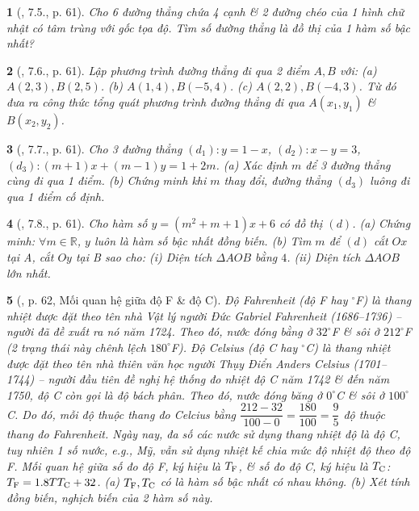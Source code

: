 \documentclass{article}
\newtheorem{baitoan}{}
\begin{document}
\begin{baitoan}[\cite{Binh_boi_duong_Toan_9_tap_1}, 7.5., p. 61]
	Cho 6 đường thẳng chứa 4 cạnh \& 2 đường chéo của 1 hình chữ nhật có tâm trùng với gốc tọa độ. Tìm số đường thẳng là đồ thị của 1 hàm số bậc nhất?
\end{baitoan}

\begin{baitoan}[\cite{Binh_boi_duong_Toan_9_tap_1}, 7.6., p. 61]
	Lập phương trình đường thẳng đi qua 2 điểm $A,B$ với: (a) $A(2,3),B(2,5)$. (b) $A(1,4),B(-5,4)$. (c) $A(2,2),B(-4,3)$. Từ đó đưa ra công thức tổng quát phương trình đường thẳng đi qua $A(x_1,y_1)$ \& $B(x_2,y_2)$.
\end{baitoan}

\begin{baitoan}[\cite{Binh_boi_duong_Toan_9_tap_1}, 7.7., p. 61]
	Cho 3 đường thẳng $(d_1):y = 1 - x$, $(d_2):x - y = 3$, $(d_3):(m + 1)x + (m - 1)y = 1 + 2m$. (a) Xác định $m$ để 3 đường thẳng cùng đi qua 1 điểm. (b) Chứng minh khi $m$ thay đổi, đường thẳng $(d_3)$ luông đi qua 1 điểm cố định.
\end{baitoan}

\begin{baitoan}[\cite{Binh_boi_duong_Toan_9_tap_1}, 7.8., p. 61]
	Cho hàm số $y = (m^2 + m + 1)x + 6$ có đồ thị $(d)$. (a) Chứng minh: $\forall m\in\mathbb{R}$, $y$ luôn là hàm số bậc nhất đồng biến. (b) Tìm $m$ để $(d)$ cắt $Ox$ tại A, cắt $Oy$ tại B sao cho: (i) Diện tích $\Delta AOB$ bằng $4$. (ii) Diện tích $\Delta AOB$ lớn nhất.
\end{baitoan}

\begin{baitoan}[\cite{Binh_boi_duong_Toan_9_tap_1}, p. 62, Mối quan hệ giữa độ F \& độ C]
	Độ Fahrenheit (độ {\rm F} hay ${}^\circ${\rm F}) là thang nhiệt được đặt theo tên nhà Vật lý người Đức Gabriel Fahrenheit (1686--1736) -- người đã đề xuất ra nó năm 1724. Theo đó, nước đóng bằng ở $32^\circ${\rm F} \& sôi ở $212^\circ${\rm F} (2 trạng thái này chênh lệch $180^\circ${\rm F}). Độ Celsius (độ {\rm C} hay ${}^\circ${\rm C}) là thang nhiệt được đặt theo tên nhà thiên văn học người Thụy Điển Anders Celsius (1701--1744) -- người đầu tiên đề nghị hệ thống đo nhiệt độ {\rm C} năm 1742 \& đến năm 1750, độ {\rm C} còn gọi là độ bách phân. Theo đó, nước đóng băng ở $0^\circ${\rm C} \& sôi ở $100^\circ${\rm C}. Do đó, mỗi độ thuộc thang đo Celcius bằng $\dfrac{212 - 32}{100 - 0} = \dfrac{180}{100} = \dfrac{9}{5}$ độ thuộc thang đo Fahrenheit. Ngày nay, đa số các nước sử dụng thang nhiệt độ là độ {\rm C}, tuy nhiên 1 số nước, e.g., Mỹ, vẫn sử dụng nhiệt kế chia mức độ nhiệt độ theo độ {\rm F}. Mối quan hệ giữa số đo độ {\rm F}, ký hiệu là $T_{\rm F}$, \& số đo độ {\rm C}, ký hiệu là $T_{\rm C}$: $T_{\rm F} = 1.8TT_{\rm C} + 32$. (a) $T_{\rm F},T_{\rm C}$ có là hàm số bậc nhất có nhau không. (b) Xét tính đồng biến, nghịch biến của 2 hàm số này.
\end{baitoan}
\end{document}
